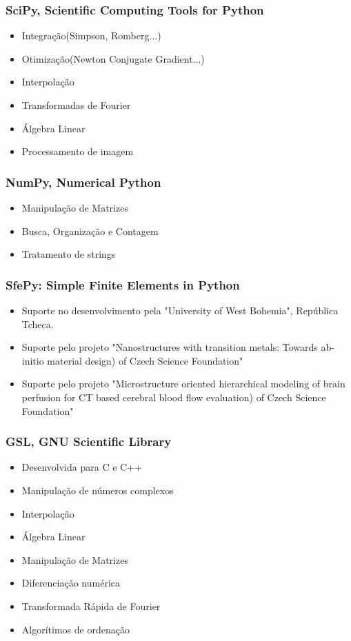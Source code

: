 \documentclass{beamer}
\begin{document}
\begin{frame}
    \frametitle{SciPy, Scientific Computing Tools for Python}
    \begin{itemize}
        \item Integração(Simpson, Romberg...)
        \item Otimização(Newton Conjugate Gradient...)
        \item Interpolação
        \item Transformadas de Fourier
        \item Álgebra Linear
        \item Processamento de imagem
    \end{itemize}
\end{frame}


\begin{frame}
    \frametitle{NumPy, Numerical Python}
    \begin{itemize}
        \item Manipulação de Matrizes
        \item Busca, Organização e Contagem
        \item Tratamento de strings
    \end{itemize}
\end{frame}

\begin{frame}
    \frametitle{SfePy: Simple Finite Elements in Python}

    \begin{itemize}
        \item Suporte no desenvolvimento pela "University of West Bohemia", República Tcheca.
        \item Suporte pelo projeto "Nanostructures with transition metals: Towards ab-initio material design) of Czech Science Foundation"
        \item Suporte pelo projeto "Microstructure oriented hierarchical modeling of brain perfusion for CT based cerebral blood flow evaluation) of Czech Science Foundation"
    \end{itemize}
\end{frame}

\begin{frame}
    \frametitle{GSL, GNU Scientific Library}

    \begin{itemize}
        \item Desenvolvida para C e C++
        \item Manipulação de números complexos
        \item Interpolação
        \item Álgebra Linear
        \item Manipulação de Matrizes
        \item Diferenciação numérica
        \item Transformada Rápida de Fourier
        \item Algorítimos de ordenação
    \end{itemize}
\end{frame}
\end{document}
